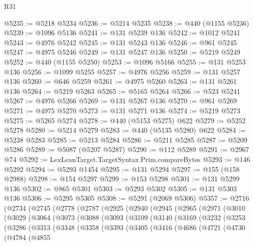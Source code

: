 \begin{lexlean}{R31}
\begin{coremodule}
@5235 := @5218 @5234
@5236 := @5214 @5235
@5238 := @440 (@1155 @5236)
@5239 := @1096 @5136
@5241 := @131 @5239 @136
@5242 := @1012 @5241
@5243 := @4976 @5242
@5245 := @131 @5243 @136
@5246 := @961 @5245
@5247 := @4975 @5246
@5249 := @131 @5247 @136
@5250 := @5219 @5249
@5252 := @440 (@1155 @5250)
@5253 := @1096 @5166
@5255 := @131 @5253 @136
@5256 := @1099 @5255
@5257 := @4976 @5256
@5259 := @131 @5257 @136
@5260 := @646 @5259
@5261 := @4975 @5260
@5263 := @131 @5261 @136
@5264 := @5219 @5263
@5265 := @5165 @5264
@5266 := @523 @5241
@5267 := @4976 @5266
@5269 := @131 @5267 @136
@5270 := @961 @5269
@5271 := @4975 @5270
@5273 := @131 @5271 @136
@5274 := @5219 @5273
@5275 := @5265 @5274
@5278 := @440 (@5153 @5275) @622
@5279 := @5252 @5278
@5280 := @5214 @5279
@5283 := @440 (@5135 @5280) @622
@5284 := @5238 @5283
@5285 := @5213 @5284
@5286 := @5211 @5285
@5287 := @5209 @5286
@5289 := @5087 (@5207 @5287)
@5290 := @112 @5289
@5291 := @2967 @74
@5292 := LexLeanTarget.TargetSyntax.Prim.compareBytes
@5293 := @146 @5292
@5294 := @5293 @1454
@5295 := @131 @5294
@5297 := @155 (@158 @2988)
@5298 := @154 @5297
@5299 := @153 @5298
@5301 := @131 @5299 @136
@5302 := @865 @5301
@5303 := @5293 @5302
@5305 := @131 @5303 @136
@5306 := @5295 @5305
@5308 := @5291 (@2069 @5306)
@5357 := @2716
    (@2734
      (@2745
        (@2778
          (@2787
            (@2925
              (@2940
                (@2945
                  (@2965
                    (@2971
                      (@3010
                        (@3029
                          (@3064
                            (@3073
                              (@3088
                                (@3093
                                  (@3109
                                    (@3140
                                      (@3169
                                        (@3232
                                          (@3253
                                            (@3286
                                              (@3313
                                                (@3348
                                                  (@3358
                                                    (@3393
                                                      (@3405
                                                        (@3416
                                                          (@4686
                                                            (@4721
                                                              (@4730
                                                                (@4784
                                                                  (@4855

\end{coremodule}
\end{lexlean}
